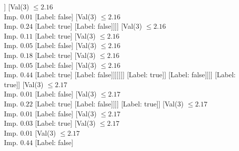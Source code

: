\documentclass[margin=10pt]{standalone}
\begin{document}
\begin{forest}
																												[Val($3$) $ \leq 2.16$ \\ Imp. $0.01$
																													[Val($3$) $ \leq 2.16$ \\ Imp. $0.02$
																														[Val($3$) $ \leq 2.16$ \\ Imp. $0.44$
																															[Label: false]
																															[Label: true]]
																														[Val($3$) $ \leq 2.16$ \\ Imp. $0.01$
																															[Label: false]
																															[Val($3$) $ \leq 2.16$ \\ Imp. $0.24$
																																[Label: true]
																																[Label: false]]]]
																													[Val($3$) $ \leq 2.16$ \\ Imp. $0.11$
																														[Label: true]
																														[Val($3$) $ \leq 2.16$ \\ Imp. $0.05$
																															[Label: false]
																															[Val($3$) $ \leq 2.16$ \\ Imp. $0.18$
																																[Label: true]
																																[Val($3$) $ \leq 2.16$ \\ Imp. $0.05$
																																	[Label: false]
																																	[Val($3$) $ \leq 2.16$ \\ Imp. $0.44$
																																		[Label: true]
																																		[Label: false]]]]]]]
																												[Label: true]]
																											[Label: false]]]]
																								[Label: true]]
																							[Val($3$) $ \leq 2.17$ \\ Imp. $0.01$
																								[Label: false]
																								[Val($3$) $ \leq 2.17$ \\ Imp. $0.22$
																									[Label: true]
																									[Label: false]]]]
																						[Label: true]]
																					[Val($3$) $ \leq 2.17$ \\ Imp. $0.01$
																						[Label: false]
																						[Val($3$) $ \leq 2.17$ \\ Imp. $0.03$
																							[Label: true]
																							[Val($3$) $ \leq 2.17$ \\ Imp. $0.01$
																								[Val($3$) $ \leq 2.17$ \\ Imp. $0.44$
																									[Label: false]

\end{forest}
\end{document}

